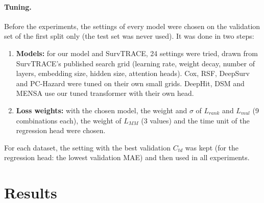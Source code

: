 \documentclass[11pt]{article}
\begin{document}
\paragraph{Tuning.} Before the experiments, the settings of every model were chosen on the
validation set of the first split only (the test set was never used). It was done in two steps:
\begin{enumerate}
  \item \textbf{Models:} for our model and SurvTRACE, 24 settings were tried, drawn from SurvTRACE's
        published search grid (learning rate, weight decay, number of layers, embedding size,
        hidden size, attention heads). Cox, RSF, DeepSurv and PC-Hazard were tuned on their own small
        grids. DeepHit, DSM and MENSA use our tuned transformer with their own head.
  \item \textbf{Loss weights:} with the chosen model, the weight and $\sigma$ of $L_{rank}$ and
        $L_{mul}$ (9 combinations each), the weight of $L_{MM}$ (3 values) and the time unit of the
        regression head were chosen.
\end{enumerate}
For each dataset, the setting with the best validation $C_{td}$ was kept (for the regression head:
the lowest validation MAE) and then used in all experiments.

\section{Results}
\end{document}
